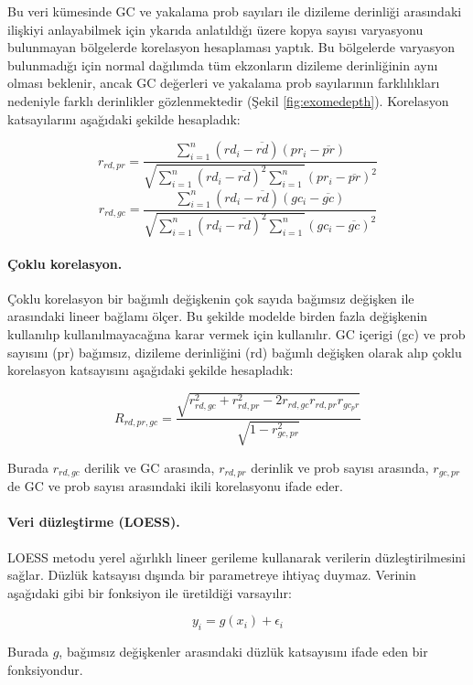 \documentclass[11pt]{article}
\begin{document}
Bu veri kümesinde GC ve yakalama prob sayıları ile dizileme derinliği arasındaki ilişkiyi anlayabilmek için ykarıda anlatıldığı üzere kopya sayısı varyasyonu bulunmayan bölgelerde korelasyon hesaplaması yaptık. Bu bölgelerde varyasyon bulunmadığı için normal dağılımda tüm ekzonların dizileme derinliğinin aynı olması beklenir, ancak GC değerleri ve yakalama prob sayılarının farklılıkları nedeniyle farklı derinlikler gözlenmektedir (Şekil \ref{fig:exomedepth}). Korelasyon katsayılarını aşağıdaki şekilde hesapladık:

\[r_{rd,pr} = \frac{\sum_{i=1}^{n}(rd_i-\overline{rd})(pr_i-\overline{pr})}{\sqrt{\sum_{i=1}^{n}(rd_i-\overline{rd})^2\sum_{i=1}^{n}}(pr_i-\overline{pr})^2} \]
\[r_{rd,gc} = \frac{\sum_{i=1}^{n}(rd_i-\overline{rd})(gc_i-\overline{gc})}{\sqrt{\sum_{i=1}^{n}(rd_i-\overline{rd})^2\sum_{i=1}^{n}}(gc_i-\overline{gc})^2} \]

\paragraph{Çoklu korelasyon.}
Çoklu korelasyon bir bağımlı değişkenin çok sayıda bağımsız değişken ile arasındaki lineer bağlamı ölçer. Bu şekilde modelde birden fazla değişkenin kullanılıp kullanılmayacağına karar vermek için kullanılır. GC içerigi (gc) ve prob sayısını (pr) bağımsız, dizileme derinliğini (rd) bağımlı değişken olarak alıp çoklu korelasyon katsayısını aşağıdaki şekilde hesapladık:

\[R_{rd,pr,gc} = \frac{\sqrt{r_{rd,gc}^2 + r_{rd,pr}^2 - 2r_{rd,gc}r_{rd,pr}r_{gc_pr}}}{\sqrt{1-r_{gc,pr}^2}}\]

Burada $r_{rd,gc}$ derilik ve GC arasında, $r_{rd,pr}$ derinlik ve prob sayısı arasında, $r_{gc,pr}$ de GC ve prob sayısı arasındaki ikili korelasyonu ifade eder.

\paragraph{Veri düzleştirme (LOESS).} 
LOESS metodu yerel ağırlıklı lineer gerileme kullanarak verilerin düzleştirilmesini sağlar. Düzlük katsayısı dışında bir parametreye ihtiyaç duymaz. Verinin aşağıdaki gibi bir fonksiyon ile üretildiği varsayılır:

\[y_i = g(x_i) + \epsilon_i\]

Burada $g$, bağımsız değişkenler arasındaki düzlük katsayısını ifade eden bir fonksiyondur.

\end{document}
